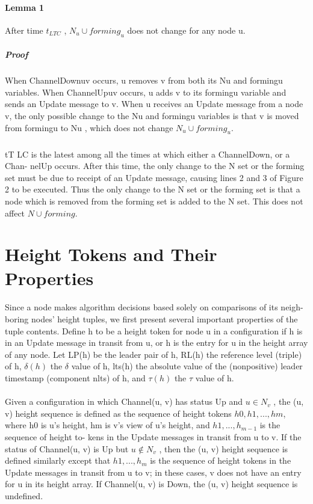\paragraph{Lemma 1}After time $t_{LTC}$ , $N_u \cup forming_u$ does not change for any node u.
\subparagraph{Proof}When ChannelDownuv occurs, u removes v from both its Nu and formingu variables. When ChannelUpuv occurs, u adds v to its formingu variable and sends an Update message to v. When u receives an Update message from a node v, the only possible change to the Nu and formingu variables is that v is moved from formingu to Nu , which does not change $N_u \cup forming_u$.
\subparagraph{}tT LC is the latest among all the times at which either a ChannelDown, or a Chan- nelUp occurs. After this time, the only change to the N set or the forming set must be due to receipt of an Update message, causing lines 2 and 3 of Figure 2 to be executed. Thus the only change to the N set or the forming set is that a node which is removed from the forming set is added to the N set. This does not affect $N \cup forming$.
\section{Height Tokens and Their Properties}
\paragraph{}Since a node makes algorithm decisions based solely on comparisons of its neigh- boring nodes' height tuples, we first present several important properties of the tuple contents. Define h to be a height token for node u in a configuration if h is in an Update message in transit from u, or h is the entry for u in the height array of any node. Let LP(h) be the leader pair of h, RL(h) the reference level (triple) of h, $\delta(h)$ the $\delta$ value of h, lts(h) the absolute value of the (nonpositive) leader timestamp (component nlts) of h, and $\tau (h)$ the $\tau$ value of h.
\paragraph{}Given a configuration in which Channel(u, v) has status Up and $u \in N_v$ , the (u, v) height sequence is defined as the sequence of height tokens $h0, h1, ... , hm$, where h0 is u's height, hm is v's view of u's height, and $h1 , . . . , h_{m-1}$ is the sequence of height to- kens in the Update messages in transit from u to v. If the status of Channel(u, v) is Up but $u \not\in N_v$ , then the (u, v) height sequence is defined similarly except that $h1 , . . . , h_m$ is the sequence of height tokens in the Update messages in transit from u to v; in these cases, v does not have an entry for u in its height array. If Channel(u, v) is Down, the (u, v) height sequence is undefined.
